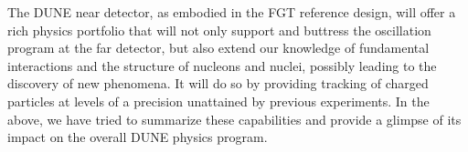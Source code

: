The DUNE near detector, as embodied in the FGT reference design, will
offer a rich physics portfolio that will not only support and buttress
the oscillation program at the far detector, but also extend our
knowledge of fundamental interactions and the structure of nucleons
and nuclei, possibly leading to the discovery of new phenomena. It
will do so by providing tracking of charged particles at levels of a
precision unattained by previous experiments.  In the above, we have
tried to summarize these capabilities and provide a glimpse of its
impact on the overall DUNE physics program.



%


